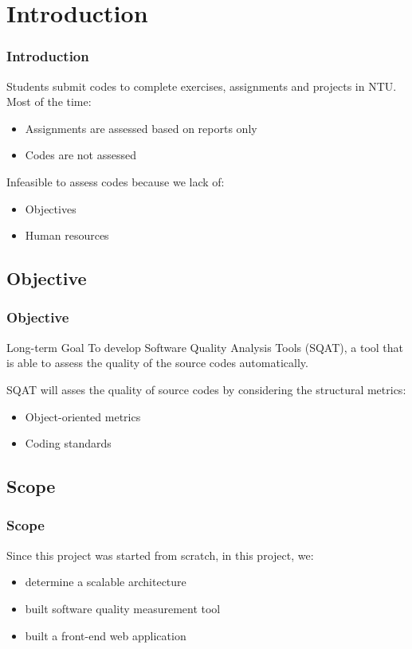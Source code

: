 \section{Introduction}
\begin{frame}
\frametitle{Introduction}

Students submit codes to complete exercises, assignments and projects in NTU. Most of the time:

\begin{itemize}
  \item Assignments are assessed based on reports only
  \item Codes are not assessed
\end{itemize} \pause

Infeasible to assess codes because we lack of:

\begin{itemize}
  \item Objectives
  \item Human resources
\end{itemize}
\end{frame}

\subsection{Objective}
\begin{frame}
\frametitle{Objective}

\begin{block}{Long-term Goal}
To develop Software Quality Analysis Tools (SQAT), a tool that is able to assess the quality of the source codes automatically.
\end{block} \pause

SQAT will asses the quality of source codes by considering the structural metrics:

\begin{itemize}
  \item Object-oriented metrics
  \item Coding standards
\end{itemize}
\end{frame}

\subsection{Scope}
\begin{frame}
\frametitle{Scope}

Since this project was started from scratch, in this project, we:

\begin{itemize}
  \item determine a scalable architecture
  \item built software quality measurement tool
  \item built a front-end web application
\end{itemize}

\end{frame}